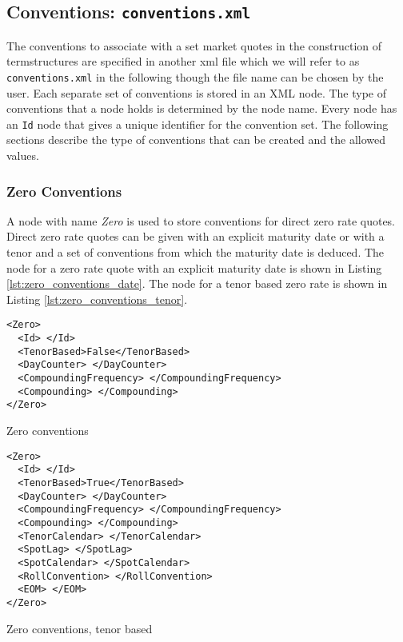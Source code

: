 \subsection{Conventions: {\tt conventions.xml}}
\label{sec:conventions}

The conventions to associate with a set market quotes in the construction of termstructures are specified in another xml
file which we will refer to as {\tt conventions.xml} in the following though the file name can be chosen by the user.
Each separate set of conventions is stored in an XML node. The type of conventions that a node holds is determined by
the node name. Every node has an \lstinline!Id! node that gives a unique identifier for the convention set. The
following sections describe the type of conventions that can be created and the allowed values.

\subsubsection{Zero Conventions}
A node with name \emph{Zero} is used to store conventions for direct zero rate quotes. Direct zero rate quotes can be
given with an explicit maturity date or with a tenor and a set of conventions from which the maturity date is
deduced. The node for a zero rate quote with an explicit maturity date is shown in Listing
\ref{lst:zero_conventions_date}. The node for a tenor based zero rate is shown in Listing
\ref{lst:zero_conventions_tenor}.

\begin{listing}[H]
\begin{verbatim}
<Zero>
  <Id> </Id>
  <TenorBased>False</TenorBased>
  <DayCounter> </DayCounter>
  <CompoundingFrequency> </CompoundingFrequency>
  <Compounding> </Compounding>
</Zero>
\end{verbatim}
\caption{Zero conventions}
\label{lst:zero_conventions_date}
\end{listing}

\begin{listing}[H]
\begin{verbatim}
<Zero>
  <Id> </Id>
  <TenorBased>True</TenorBased>
  <DayCounter> </DayCounter>
  <CompoundingFrequency> </CompoundingFrequency>
  <Compounding> </Compounding>
  <TenorCalendar> </TenorCalendar>
  <SpotLag> </SpotLag>
  <SpotCalendar> </SpotCalendar>
  <RollConvention> </RollConvention>
  <EOM> </EOM>
</Zero>
\end{verbatim}
\caption{Zero conventions, tenor based}
\label{lst:zero_conventions_tenor}
\end{listing}

